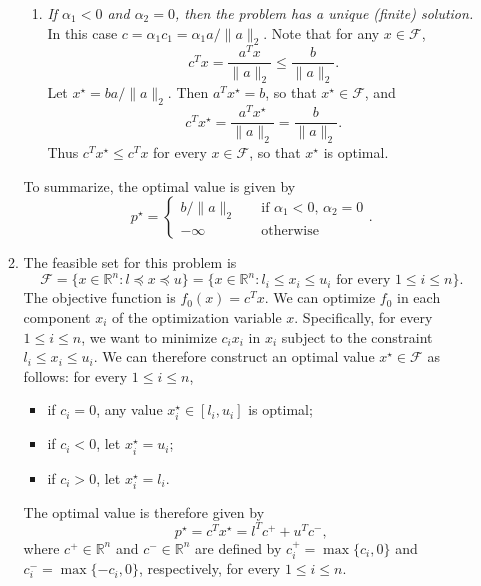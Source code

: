 \documentclass[letterpaper,12pt]{article}
\begin{document}
\begin{enumerate}
\begin{enumerate}
\begin{enumerate}
  \item \textit{If $\alpha_1 < 0$ and $\alpha_2 = 0$, then the problem
      has a unique (finite) solution.} In this case
    $c = \alpha_1 c_1 = \alpha_1 a / \lVert a \rVert_2$. Note that for
    any $x \in \mathcal{F}$,
    \begin{equation*}
      c^T x = \frac{a^T x}{\lVert a \rVert_2} \leq \frac{b}{\lVert a \rVert_2}.
    \end{equation*}
    Let $x^\star = ba / \lVert a \rVert_2$. Then $a^T x^\star = b$, so
    that $x^\star \in \mathcal{F}$, and
    \begin{equation*}
      c^T x^\star = \frac{a^T x^\star}{\lVert a \rVert_2}
        = \frac{b}{\lVert a \rVert_2}.
    \end{equation*}
    Thus $c^T x^\star \leq c^T x$ for every $x \in \mathcal{F}$, so
    that $x^\star$ is optimal.
  \end{enumerate}
  To summarize, the optimal value is given by
  \begin{equation*}
    p^\star = \begin{cases}
      b / \lVert a \rVert_2 &\quad \text{if $\alpha_1 < 0$, $\alpha_2 = 0$} \\
      -\infty &\quad \text{otherwise}
    \end{cases}.
  \end{equation*}

\item The feasible set for this problem is
  \begin{equation*}
    \mathcal{F} = \{x \in \mathbb{R}^n : l \preceq x \preceq u\}
      = \{x \in \mathbb{R}^n :
          \text{$l_i \leq x_i \leq u_i$ for every $1 \leq i \leq n$}\}.
  \end{equation*}
  The objective function is $f_0(x) = c^T x$. We can optimize $f_0$ in
  each component $x_i$ of the optimization variable $x$. Specifically,
  for every $1 \leq i \leq n$, we want to minimize $c_i x_i$ in $x_i$
  subject to the constraint $l_i \leq x_i \leq u_i$. We can therefore
  construct an optimal value $x^\star \in \mathcal{F}$ as follows: for
  every $1 \leq i \leq n$,
  \begin{itemize}
  \item if $c_i = 0$, any value $x^\star_i \in [l_i, u_i]$ is optimal;
  \item if $c_i < 0$, let $x^\star_i = u_i$;
  \item if $c_i > 0$, let $x^\star_i = l_i$.
  \end{itemize}
  The optimal value is therefore given by
  \begin{equation*}
    p^\star = c^T x^\star = l^T c^+ + u^T c^-,
  \end{equation*}
  where $c^+ \in \mathbb{R}^n$ and $c^- \in \mathbb{R}^n$ are defined
  by $c^+_i = \max\{c_i, 0\}$ and $c^-_i = \max\{-c_i, 0\}$,
  respectively, for every $1 \leq i \leq n$.
\end{enumerate}


\end{enumerate}
\end{document}
